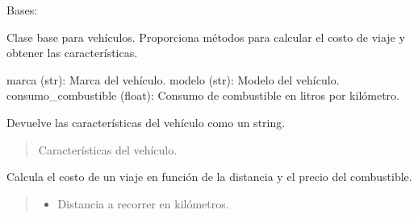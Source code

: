 \documentclass[letterpaper,10pt,spanish]{sphinxmanual}
\begin{document}
\begin{fulllineitems}
\label{\detokenize{pr8:pr8.4.Vehiculo}}
\pysigstartsignatures
{}
\pysigstopsignatures
\sphinxAtStartPar
Bases: 

\sphinxAtStartPar
Clase base para vehículos. Proporciona métodos para calcular el costo de viaje y obtener las características.
\begin{description}
\sphinxAtStartPar
marca (str): Marca del vehículo.
modelo (str): Modelo del vehículo.
consumo\_combustible (float): Consumo de combustible en litros por kilómetro.

\end{description}

\begin{fulllineitems}
\label{\detokenize{pr8:pr8.4.Vehiculo.caracteristicas}}
\pysigstartsignatures
{}
\pysigstopsignatures
\sphinxAtStartPar
Devuelve las características del vehículo como un string.
\begin{quote}\begin{description}
\sphinxAtStartPar
Características del vehículo.

\end{description}\end{quote}

\end{fulllineitems}


\begin{fulllineitems}
\label{\detokenize{pr8:pr8.4.Vehiculo.costo_viaje}}
\pysigstartsignatures
{}
\pysigstopsignatures
\sphinxAtStartPar
Calcula el costo de un viaje en función de la distancia y el precio del combustible.
\begin{quote}\begin{description}
\begin{itemize}
\item {} 
\sphinxAtStartPar
{} \textendash{} Distancia a recorrer en kilómetros.


\end{itemize}
\end{description}
\end{quote}
\end{fulllineitems}
\end{fulllineitems}
\end{document}
